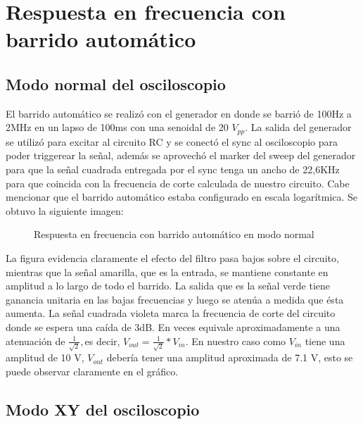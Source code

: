 \section{Respuesta en frecuencia con barrido automático}

\subsection{Modo normal del osciloscopio}

El barrido automático se realizó con el generador en donde se barrió de 100Hz a 2MHz en un lapso de 100ms con una senoidal
de 20 $V_{pp}$. La salida del generador se utilizó para excitar al circuito RC y se conectó el sync al osciloscopio para poder triggerear la señal, además se aprovechó el marker del sweep del generador para que la señal cuadrada entregada por el sync tenga un ancho de 22,6KHz para que coincida con la frecuencia de corte calculada de nuestro circuito.
Cabe mencionar que el barrido automático estaba configurado en escala logarítmica. Se obtuvo la siguiente imagen:

\begin{figure}[H]
\begin{center}
\par\end{center}
\caption{Respuesta en frecuencia con barrido automático en modo normal}
\end{figure}

La figura evidencia claramente el efecto del filtro pasa bajos sobre el circuito, mientras que la señal amarilla, que es la entrada, se mantiene constante en amplitud a lo largo de todo el barrido. La salida que es la señal verde tiene ganancia unitaria en las bajas frecuencias y luego se atenúa a medida que ésta aumenta. La señal cuadrada violeta
marca la frecuencia de corte del circuito donde se espera una caída de 3dB. En veces equivale aproximadamente a una atenuación de $\frac{1}{\sqrt{2}},$es
decir, $V_{out}=\frac{1}{\sqrt{2}}*V_{in}$. En nuestro caso como $V_{in}$ tiene
una amplitud de 10 V, $V_{out}$ debería tener una amplitud aproximada de 7.1 V, esto se puede observar claramente en el gráfico.

\subsection{Modo XY del osciloscopio}

